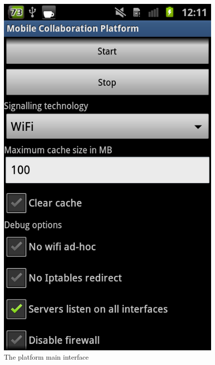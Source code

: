 \documentclass[12pt, a4paper, oneside]{book}
\begin{document}
\begin{figure}[h!]
\centering
\includegraphics[scale=0.3]{images/platformActivity.png}
\caption{The platform main interface}
\label{fig:platformActivity}
\end{figure}
\end{document}
